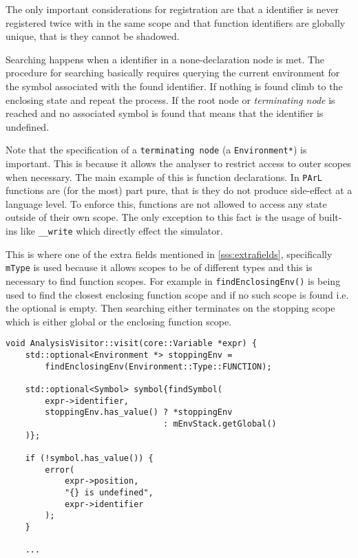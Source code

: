 The only important considerations for registration are that a
identifier is never registered twice with in the same scope and
that function identifiers are globally unique, that is they
cannot be shadowed.



Searching happens when a identifier in a none-declaration node
is met. The procedure for searching basically requires querying
the current environment for the symbol associated with the found
identifier. If nothing is found climb to the enclosing state and
repeat the process. If the root node or \emph{terminating node}
is reached and no associated symbol is found that means that the
identifier is undefined.

Note that the specification of a \texttt{terminating node} (a
\texttt{Environment*}) is important. This is because it allows
the analyser to restrict access to outer scopes when necessary.
The main example of this is function declarations. In
\texttt{PArL} functions are (for the most) part pure, that is
they do not produce side-effect at a language level. To enforce
this, functions are not allowed to access any state outside of
their own scope. The only exception to this fact is the usage of
built-ins like \texttt{__write} which directly effect the
simulator.

This is where one of the extra fields mentioned in
\ref{sss:extrafields}, specifically \texttt{mType} is used
because it allows scopes to be of different types and this is
necessary to find function scopes. For example in
 \texttt{findEnclosingEnv()} is being
used to find the closest enclosing function scope and if no such
scope is found i.e. the optional is empty. Then searching either
terminates on the stopping scope which is either global or the
enclosing function scope.

\begin{lstlisting}[caption={The \texttt{visit(Variable *)}
method in the \texttt{AnalysisVisitor} class
(analysis/AnalysisVisitor.cpp)},label=lst:visitvariable]
void AnalysisVisitor::visit(core::Variable *expr) {
    std::optional<Environment *> stoppingEnv =
        findEnclosingEnv(Environment::Type::FUNCTION);

    std::optional<Symbol> symbol{findSymbol(
        expr->identifier,
        stoppingEnv.has_value() ? *stoppingEnv
                                : mEnvStack.getGlobal()
    )};

    if (!symbol.has_value()) {
        error(
            expr->position,
            "{} is undefined",
            expr->identifier
        );
    }

    ...
\end{lstlisting}

